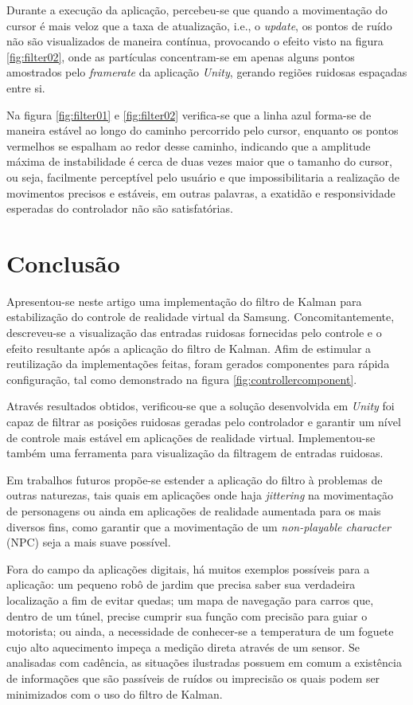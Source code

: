 \documentclass[conference]{IEEEtran}
\begin{document}
Durante a execução da aplicação, percebeu-se que quando a movimentação do cursor é mais veloz que a taxa de atualização, i.e., o \textit{update}, os pontos de ruído não são visualizados de maneira contínua, provocando o efeito visto na figura \ref{fig:filter02}, onde as partículas concentram-se em apenas alguns pontos amostrados pelo \textit{framerate} da aplicação \textit{Unity}, gerando regiões ruidosas espaçadas entre si.

Na figura \ref{fig:filter01} e \ref{fig:filter02} verifica-se que a linha azul forma-se de maneira estável ao longo do caminho percorrido pelo cursor, enquanto os pontos vermelhos se espalham ao redor desse caminho, indicando que a amplitude máxima de instabilidade é cerca de duas vezes maior que o tamanho do cursor, ou seja, facilmente perceptível pelo usuário e que impossibilitaria a realização de movimentos precisos e estáveis, em outras palavras, a exatidão e responsividade esperadas do controlador não são satisfatórias.

\section{Conclusão} \label{sec:conclusion}

Apresentou-se neste artigo uma implementação do filtro de Kalman para estabilização do controle de realidade virtual da Samsung. Concomitantemente, descreveu-se a visualização das entradas ruidosas fornecidas pelo controle e o efeito resultante após a aplicação do filtro de Kalman. Afim de estimular a reutilização da implementações feitas, foram gerados componentes para rápida configuração, tal como demonstrado na figura \ref{fig:controllercomponent}.


Através resultados obtidos, verificou-se que a solução desenvolvida em \textit{Unity} foi capaz de filtrar as posições ruidosas geradas pelo controlador e garantir um nível de controle mais estável em aplicações de realidade virtual. Implementou-se também uma ferramenta para visualização da filtragem de entradas ruidosas.


Em trabalhos futuros propõe-se estender a aplicação do filtro à problemas de outras naturezas, tais quais em aplicações onde haja \textit{jittering} na movimentação de personagens ou ainda em aplicações de realidade aumentada para os mais diversos fins, como garantir que a movimentação de um \textit{non-playable character} (NPC) seja a mais suave possível.


Fora do campo da aplicações digitais, há muitos exemplos possíveis para a aplicação:  um pequeno robô de jardim que precisa saber sua verdadeira localização a fim de evitar quedas; um mapa de navegação para carros que, dentro de um túnel, precise cumprir sua função com precisão para guiar o motorista; ou ainda, a necessidade de conhecer-se a temperatura de um foguete cujo alto aquecimento impeça a medição direta através de um sensor. Se analisadas com cadência, as situações ilustradas possuem em comum a existência de informações que são passíveis de ruídos ou imprecisão os quais podem ser minimizados com o uso do filtro de Kalman.
\end{document}
